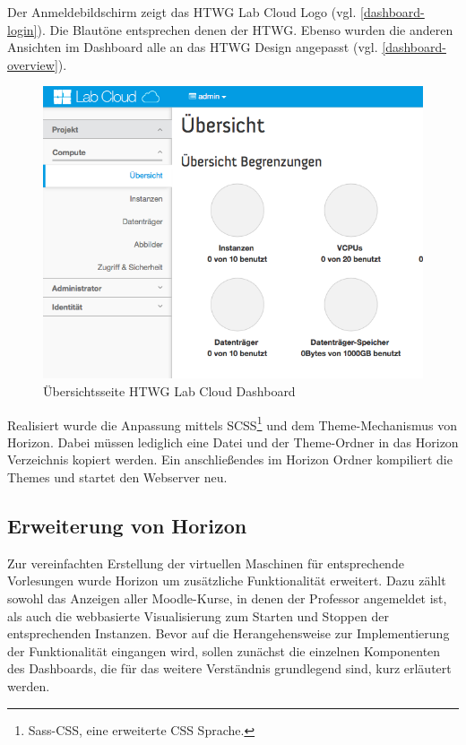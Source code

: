 Der Anmeldebildschirm zeigt das HTWG Lab Cloud Logo (vgl. \autoref{dashboard-login}).
Die Blautöne entsprechen denen der HTWG.
Ebenso wurden die anderen Ansichten im Dashboard alle an das HTWG Design angepasst (vgl. \autoref{dashboard-overview}).

\begin{figure}[H]
\centering
\includegraphics[scale=0.43]{img/dashboard-overview.png}
\caption{Übersichtsseite HTWG Lab Cloud Dashboard}
\label{dashboard-overview}
\end{figure}

Realisiert wurde die Anpassung mittels SCSS\footnote{Sass-CSS, eine erweiterte CSS Sprache.} und dem Theme-Mechanismus von Horizon.
Dabei müssen lediglich eine Datei und der  Theme-Ordner in das Horizon Verzeichnis kopiert werden.
Ein anschließendes  im Horizon Ordner kompiliert die Themes und startet den Webserver neu.

\subsection{Erweiterung von Horizon}\label{horizon}
Zur vereinfachten Erstellung der virtuellen Maschinen für entsprechende Vorlesungen wurde Horizon um zusätzliche Funktionalität erweitert. Dazu zählt sowohl das Anzeigen aller Moodle-Kurse, in denen der Professor angemeldet ist, als auch die webbasierte Visualisierung zum Starten und Stoppen der entsprechenden Instanzen. Bevor auf die Herangehensweise zur Implementierung der Funktionalität eingangen wird, sollen zunächst die einzelnen Komponenten des Dashboards, die für das weitere Verständnis grundlegend sind, kurz erläutert werden. 

